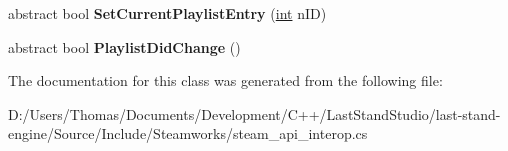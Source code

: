 \begin{DoxyCompactItemize}
\item 
\hypertarget{classValve_1_1Steamworks_1_1ISteamMusicRemote_a61baed17d3604d6b3202c1b34fb07918}{}abstract bool {\bfseries Set\+Current\+Playlist\+Entry} (\hyperlink{SDL__thread_8h_a6a64f9be4433e4de6e2f2f548cf3c08e}{int} n\+I\+D)\label{classValve_1_1Steamworks_1_1ISteamMusicRemote_a61baed17d3604d6b3202c1b34fb07918}

\item 
\hypertarget{classValve_1_1Steamworks_1_1ISteamMusicRemote_a74bad084d7f44266cad86872a711d6d2}{}abstract bool {\bfseries Playlist\+Did\+Change} ()\label{classValve_1_1Steamworks_1_1ISteamMusicRemote_a74bad084d7f44266cad86872a711d6d2}

\end{DoxyCompactItemize}


The documentation for this class was generated from the following file\+:\begin{DoxyCompactItemize}
\item 
D\+:/\+Users/\+Thomas/\+Documents/\+Development/\+C++/\+Last\+Stand\+Studio/last-\/stand-\/engine/\+Source/\+Include/\+Steamworks/steam\+\_\+api\+\_\+interop.\+cs\end{DoxyCompactItemize}
